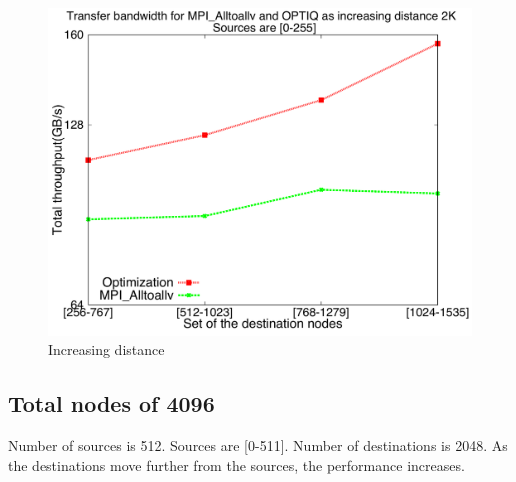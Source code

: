 \documentclass[letter]{article}
\begin{document}
\begin{figure}[h]
\vspace{-0.1in}
\centering
\includegraphics[scale=0.40]{report_figures/incrdist/incrdist_2k.pdf}
\vspace{-0.1in}
\caption{Increasing distance}
\vspace{-0.1in}
\label{fig:incrdist_2k}
\end{figure}

\clearpage
\newpage






\clearpage
\newpage

\subsection{Total nodes of 4096}

Number of sources is 512. Sources are [0-511]. Number of destinations is 2048. As the destinations move further from the sources, the performance increases.
\end{document}
